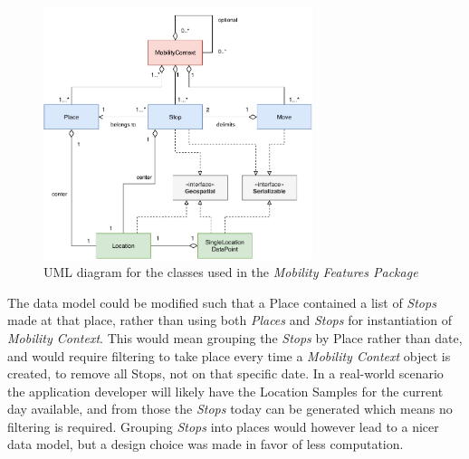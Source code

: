 \begin{figure}[h]
    \centering
    \includegraphics[width=0.7\textwidth]{images/diagrams/uml.pdf}
    \caption{UML diagram for the classes used in the \textit{Mobility Features Package}}
    \label{fig:my_label}
\end{figure}

The data model could be modified such that a Place contained a list of \textit{Stops} made at that place, rather than using both \textit{Places} and \textit{Stops} for instantiation of \textit{Mobility Context}. This would mean grouping the \textit{Stops} by Place rather than date, and would require filtering to take place every time a \textit{Mobility Context} object is created, to remove all Stops, not on that specific date. In a real-world scenario the application developer will likely have the Location Samples for the current day available, and from those the \textit{Stops} today can be generated which means no filtering is required. Grouping \textit{Stops} into places would however lead to a nicer data model, but a design choice was made in favor of less computation. 


